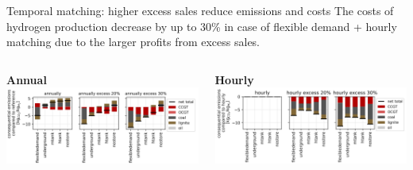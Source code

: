 \begin{frame}{Temporal matching: higher excess sales reduce emissions and costs}
	\centering
	\vspace{-2cm}
	The \alert{costs of hydrogen production decrease} by up to 30\% in case of flexible demand + hourly matching due to the larger profits from excess sales.
	\vspace{0.5cm}
  	\begin{columns}[t]
  	\begin{column}{0.5\textwidth}
  		\centering
  		\textbf{Annual} \\
  		\includegraphics[width=1\linewidth]{images/annual_excess}
  	\end{column}
  	\begin{column}{0.5\textwidth}
  		\centering
  		\textbf{Hourly} \\
  		\includegraphics[width=1\linewidth]{images/hourly_excess}
  	\end{column}
  \end{columns}

\end{frame}


